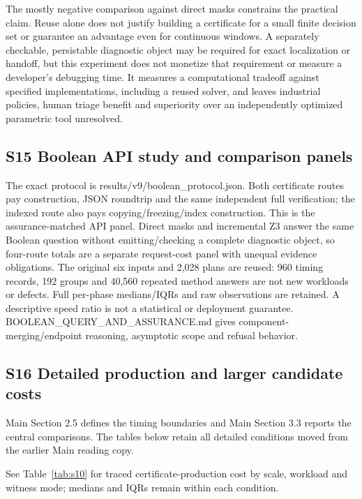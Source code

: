 \documentclass[11pt,a4paper]{article}
\theoremstyle{plain}
\theoremstyle{definition}
\theoremstyle{remark}
\begin{document}
The mostly negative comparison against direct masks constrains the practical claim. Reuse alone does not justify building a certificate for a small finite decision set or guarantee an advantage even for continuous windows. A separately checkable, persistable diagnostic object may be required for exact localization or handoff, but this experiment does not monetize that requirement or measure a developer's debugging time. It measures a computational tradeoff against specified implementations, including a reused solver, and leaves industrial policies, human triage benefit and superiority over an independently optimized parametric tool unresolved.


\subsection*{S15 Boolean API study and comparison panels}\label{sec:s15}

The exact protocol is results/v9/boolean\_protocol.json. Both certificate routes pay construction, JSON roundtrip and the same independent full verification; the indexed route also pays copying/freezing/index construction. This is the assurance-matched API panel. Direct masks and incremental Z3 answer the same Boolean question without emitting/checking a complete diagnostic object, so four-route totals are a separate request-cost panel with unequal evidence obligations. The original six inputs and 2,028 plans are reused: 960 timing records, 192 groups and 40,560 repeated method answers are not new workloads or defects. Full per-phase medians/IQRs and raw observations are retained. A descriptive speed ratio is not a statistical or deployment guarantee. BOOLEAN\_QUERY\_AND\_ASSURANCE.md gives component-merging/endpoint reasoning, asymptotic scope and refusal behavior.


\subsection*{S16 Detailed production and larger candidate costs}\label{sec:s16}

Main Section 2.5 defines the timing boundaries and Main Section 3.3 reports the central comparisons. The tables below retain all detailed conditions moved from the earlier Main reading copy.

See Table~\ref{tab:s10} for traced certificate-production cost by scale, workload and witness mode; medians and IQRs remain within each condition.
\end{document}

